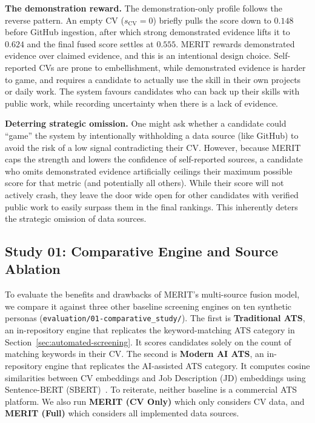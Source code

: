 \textbf{The demonstration reward.} The demonstration-only profile follows the reverse pattern. An empty CV ($s_{\mathrm{CV}} = 0$) briefly pulls the score down to $0.148$
before GitHub ingestion, after which strong demonstrated evidence lifts it to $0.624$ and the final fused score settles at $0.555$. MERIT
rewards demonstrated evidence over claimed evidence, and this is an intentional design choice. Self-reported CVs are prone to embellishment,
while demonstrated evidence is harder to game, and requires a candidate to actually use the skill in their own projects or daily work.
The system favours candidates who can back up their skills with public work, while recording uncertainty when there is a lack of evidence.

\textbf{Deterring strategic omission.} One might ask whether a candidate could ``game'' the system by intentionally withholding a 
data source (like GitHub) to avoid the risk of a low signal contradicting their CV. However, because MERIT caps the strength and 
lowers the confidence of self-reported sources, a candidate who omits demonstrated evidence artificially ceilings their maximum 
possible score for that metric (and potentially all others). While their score will not actively crash, they leave the door wide 
open for other candidates with verified public work to easily surpass them in the final rankings. This inherently deters the strategic omission of data sources.

\subsection{Study 01: Comparative Engine and Source Ablation}
\label{subsec:study-01-comparative-ablation}

To evaluate the benefits and drawbacks of MERIT's multi-source fusion model, we compare it against three other baseline screening engines on
ten synthetic personas (\texttt{evaluation/01-comparative\_study/}).
The first is \textbf{Traditional ATS}, an in-repository engine that replicates the keyword-matching ATS category in
Section~\ref{sec:automated-screening}.
It scores candidates solely on the count of matching keywords in their CV.
The second is \textbf{Modern AI ATS}, an in-repository engine that replicates the AI-assisted ATS category.
It computes cosine similarities between CV embeddings and Job Description (JD) embeddings using Sentence-BERT (SBERT)~\cite{reimers2019sentence}.
To reiterate, neither baseline is a commercial ATS platform.
We also run \textbf{MERIT (CV Only)} which only considers CV data, and \textbf{MERIT (Full)} which considers all implemented data sources.

